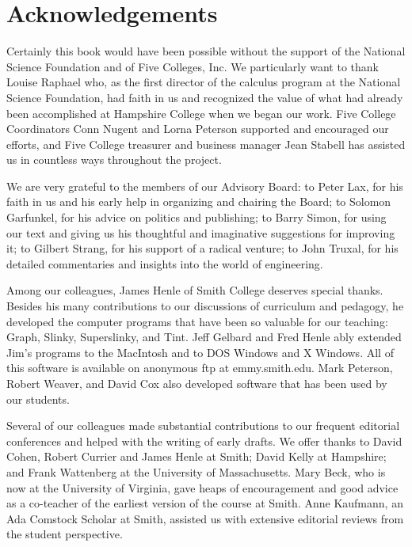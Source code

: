 \chapter*{Acknowledgements}

Certainly this book would have been possible without the support of
the National Science Foundation and of Five Colleges, Inc.  We
particularly want to thank Louise Raphael who, as the first director
of the calculus program at the National Science Foundation, had faith
in us and recognized the value of what had already been accomplished
at Hampshire College when we began our work.  Five College
Coordinators Conn Nugent and Lorna Peterson supported and encouraged
our efforts, and Five College treasurer and business manager Jean
Stabell has assisted us in countless ways throughout the project.

We are very grateful to the members of our Advisory Board: to Peter
Lax, for his faith in us and his early help in organizing and chairing
the Board; to Solomon Garfunkel, for his advice on politics and
publishing; to Barry Simon, for using our text and giving us his
thoughtful and imaginative suggestions for improving it; to Gilbert
Strang, for his support of a radical venture; to John Truxal, for his
detailed commentaries and insights into the world of engineering.

Among our colleagues, James Henle of Smith College deserves special
thanks.  Besides his many contributions to our discussions of
curriculum and pedagogy, he developed the computer programs that have
been so valuable for our teaching: Graph, Slinky, Superslinky, and
Tint.  Jeff Gelbard and Fred Henle ably extended Jim's programs to the
MacIntosh and to DOS Windows and X Windows.  All of this software is
available on anonymous ftp at emmy.smith.edu.  Mark Peterson, Robert
Weaver, and David Cox also developed software that has been used by
our students.

Several of our colleagues made substantial contributions to our
frequent editorial conferences and helped with the writing of early
drafts.  We offer thanks to David Cohen, Robert Currier and James
Henle at Smith; David Kelly at Hampshire; and Frank Wattenberg at the
University of Massachusetts.  Mary Beck, who is now at the University
of Virginia, gave heaps of encouragement and good advice as a
co-teacher of the earliest version of the course at Smith.  Anne
Kaufmann, an Ada Comstock Scholar at Smith, assisted us with extensive
editorial reviews from the student perspective.

